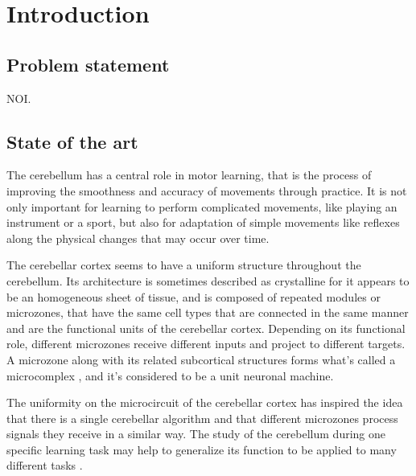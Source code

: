 \documentclass[12pt, a4paper,twoside]{tesi_upf}
\begin{document}


\mainmatter
\chapter{Introduction}

\section{Problem statement}

NOI\cite{Herreros2013b}.

\section{State of the art}

The cerebellum has a central role in motor learning, that is the process of improving the smoothness and accuracy of movements through practice. It is not only important for learning to perform complicated movements, like playing an instrument or a sport, but also for adaptation of simple movements like reflexes along the physical changes that may occur over time.

The cerebellar cortex seems to have a uniform structure throughout the cerebellum. Its architecture is sometimes described as crystalline for it appears to be an homogeneous sheet of tissue, and is composed of repeated modules or microzones, that have the same cell types that are connected in the same manner and are the functional units of the cerebellar cortex. Depending on its functional role, different microzones receive different inputs and project to different targets. A microzone along with its related subcortical structures forms what's called a microcomplex \cite{Ito1982}, and it's considered to be a unit neuronal machine.

The uniformity on the microcircuit of the cerebellar cortex has inspired the idea that there is a single cerebellar algorithm and that different microzones process signals they receive in a similar way. The study of the cerebellum during one specific learning task may help to generalize its function to be applied to many different tasks \cite{Boyden2004}.
\end{document}
